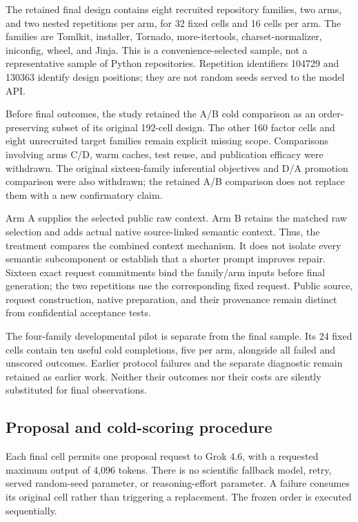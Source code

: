 The retained final design contains eight recruited repository families, two
arms, and two nested repetitions per arm, for 32 fixed cells and 16 cells per
arm. The families are Tomlkit, installer, Tornado, more-itertools,
charset-normalizer, iniconfig, wheel, and Jinja. This is a convenience-selected
sample, not a representative sample of Python repositories. Repetition
identifiers 104729 and 130363 identify design positions; they are not random
seeds served to the model API.

Before final outcomes, the study retained the A/B cold comparison as an
order-preserving subset of its original 192-cell design. The other 160 factor
cells and eight unrecruited target families remain explicit missing scope.
Comparisons involving arms C/D, warm caches, test reuse, and publication
efficacy were withdrawn. The original sixteen-family inferential objectives
and D/A promotion comparison were also withdrawn; the retained A/B comparison
does not replace them with a new confirmatory claim.

Arm A supplies the selected public raw context. Arm B retains the matched raw
selection and adds actual native source-linked semantic context. Thus, the
treatment compares the combined context mechanism. It does not isolate every
semantic subcomponent or establish that a shorter prompt improves repair.
Sixteen exact request commitments bind the family/arm inputs before final
generation; the two repetitions use the corresponding fixed request. Public
source, request construction, native preparation, and their provenance remain
distinct from confidential acceptance tests.

The four-family developmental pilot is separate from the final sample. Its
24 fixed cells contain ten useful cold completions, five per arm, alongside
all failed and unscored outcomes. Earlier protocol failures and the separate
diagnostic remain retained as earlier work. Neither their outcomes nor their
costs are silently substituted for final observations.

\subsection{Proposal and cold-scoring procedure}

Each final cell permits one proposal request to Grok 4.6, with a requested
maximum output of 4,096 tokens. There is no scientific fallback model, retry,
served random-seed parameter, or reasoning-effort parameter. A failure consumes
its original cell rather than triggering a replacement. The frozen order is
executed sequentially.

